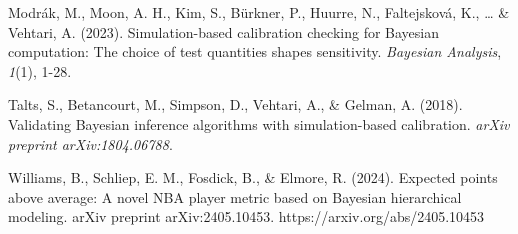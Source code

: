 \documentclass[
  letterpaper,
  DIV=11,
  numbers=noendperiod]{scrartcl}
\begin{document}
Modrák, M., Moon, A. H., Kim, S., Bürkner, P., Huurre, N., Faltejsková,
K., \ldots{} \& Vehtari, A. (2023). Simulation-based calibration
checking for Bayesian computation: The choice of test quantities shapes
sensitivity. \emph{Bayesian Analysis}, \emph{1}(1), 1-28.

Talts, S., Betancourt, M., Simpson, D., Vehtari, A., \& Gelman, A.
(2018). Validating Bayesian inference algorithms with simulation-based
calibration. \emph{arXiv preprint arXiv:1804.06788}.

Williams, B., Schliep, E. M., Fosdick, B., \& Elmore, R. (2024).
Expected points above average: A novel NBA player metric based on
Bayesian hierarchical modeling. arXiv preprint arXiv:2405.10453.
https://arxiv.org/abs/2405.10453
\end{document}
